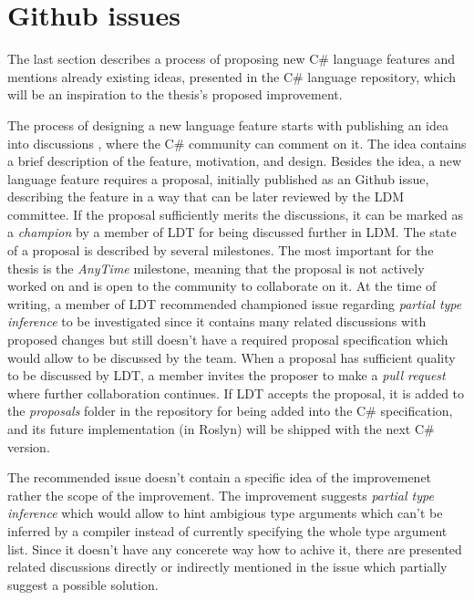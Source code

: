 \section{Github issues}

The last section describes a process of proposing new C\# language features and mentions already existing ideas, presented in the C\# language repository, which will be an inspiration to the thesis's proposed improvement.
\par
The process of designing a new language feature starts with publishing an idea into discussions \cite{online:discussions}, where the C\# community can comment on it. 
The idea contains a brief description of the feature, motivation, and design. 
Besides the idea, a new language feature requires a proposal, initially published as an Github issue, describing the feature in a way that can be later reviewed by the \ac{LDM} committee.
If the proposal sufficiently merits the discussions, it can be marked as a \textit{champion} by a member of \ac{LDT} for being discussed further in \ac{LDM}. 
The state of a proposal is described by several milestones. 
The most important for the thesis is the \textit{AnyTime} milestone, meaning that the proposal is not actively worked on and is open to the community to collaborate on it. 
At the time of writing, a member of \ac{LDT} recommended championed issue \cite{online:champion} regarding \textit{partial type inference} to be investigated since it contains many related discussions with proposed changes but still doesn’t have a required proposal specification which would allow to be discussed by the team. 
When a proposal has sufficient quality to be discussed by \ac{LDT}, a member invites the proposer to make a \textit{pull request} where further collaboration continues. 
If \ac{LDT} accepts the proposal, it is added to the \textit{proposals} folder in the repository for being added into the C\# specification, and its future implementation (in Roslyn) will be shipped with the next C\# version. 
\par
The recommended issue doesn't contain a specific idea of the improvemenet rather the scope of the improvement.
The improvement suggests \textit{partial type inference} which would allow to hint ambigious type arguments which can't be inferred by a compiler instead of currently specifying the whole type argument list.
Since it doesn't have any concerete way how to achive it, there are presented related discussions directly or indirectly mentioned in the issue which partially suggest a possible solution.


